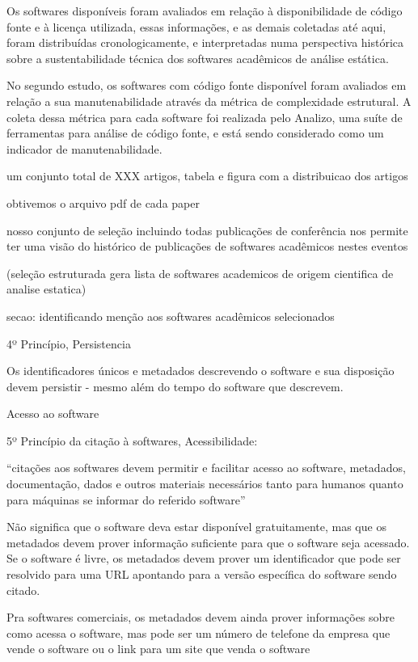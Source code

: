 Os softwares disponíveis foram avaliados em relação à disponibilidade de código
fonte e à licença utilizada, essas informações, e as demais coletadas até aqui,
foram distribuídas cronologicamente, e interpretadas numa perspectiva histórica
sobre a sustentabilidade técnica dos softwares acadêmicos de análise estática.




No segundo estudo, os softwares com código fonte disponível foram avaliados em
relação a sua manutenabilidade através da métrica de complexidade estrutural. A
coleta dessa métrica para cada software foi realizada pelo Analizo, uma suíte
de ferramentas para análise de código fonte, e está sendo considerado como um
indicador de manutenabilidade.


um conjunto total de  XXX artigos, tabela e figura com a distribuicao
dos artigos

obtivemos o arquivo pdf de cada paper

nosso conjunto de seleção incluindo todas publicações de conferência
nos permite ter uma visão do histórico de publicações de softwares
acadêmicos nestes eventos

(seleção estruturada gera lista de softwares academicos de origem cientifica de analise estatica)

secao: identificando menção aos softwares acadêmicos selecionados


4º Princípio, Persistencia

Os identificadores únicos e metadados descrevendo o software e sua disposição
devem persistir - mesmo além do tempo do software que descrevem.

Acesso ao software

5º Princípio da citação à softwares, Acessibilidade:

``citações aos softwares devem permitir e facilitar acesso ao software,
metadados, documentação, dados e outros materiais necessários tanto
para humanos quanto para máquinas se informar do referido software''

Não significa que o software deva estar disponível gratuitamente, mas que
os metadados devem prover informação suficiente para que o software seja
acessado. Se o software é livre, os metadados devem prover um identificador
que pode ser resolvido para uma URL apontando para a versão específica
do software sendo citado.

Pra softwares comerciais, os metadados devem ainda prover informações sobre
como acessa o software, mas pode ser um número de telefone da empresa que
vende o software ou o link para um site que venda o software

